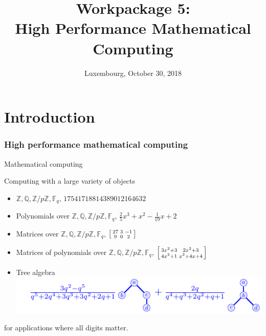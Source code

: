 \documentclass{beamer}
\title[Workpackage 5]{Workpackage 5:\\ High Performance Mathematical Computing}
\date{Luxembourg, October 30, 2018}
\institute[ODK 2nd project review]{Second OpenDreamKit Project review}
\newenvironment{smatrix}{\left[\begin{smallmatrix}}{\end{smallmatrix}\right]}
\newcommand{\Z}{\ensuremath{\mathbb{Z}\xspace}}
\newcommand{\Q}{\ensuremath{\mathbb{Q}\xspace}}
\newcommand{\F}{\ensuremath{\mathbb{F}\xspace}}
\begin{document}
\maketitle

\section*{Introduction}

\begin{frame}
  \frametitle{High performance mathematical computing}

  \begin{block}{Mathematical computing}

    Computing with a large variety of objects
        \begin{itemize}
        \item $\Z, \Q, \Z/p\Z, \F_q$, \hfill {\color{blue} $17541718814389012164632$}
        \item Polynomials over $\Z, \Q, \Z/p\Z, \F_q$, \hfill {\color{blue} $\frac{2}{5} x^{3} + x^{2} - \frac{1}{19} x + 2$}
        \item Matrices over $\Z, \Q, \Z/p\Z, \F_q$, \hfill
           {\color{blue} $\begin{smatrix} 27&3&-1\\ 9&0& 2 \end{smatrix} $}
        \item Matrices of polynomials over $\Z, \Q, \Z/p\Z, \F_q$, \hfill
          {\color{blue} $ \begin{smatrix}
            3 x^{2} + 3 & 2 x^{2} + 3 \\4 x^{2} + 1 & x^{2} + 4 x + 4
          \end{smatrix}$}
        \item Tree algebra \hfill
      \includegraphics[width=.7\textwidth]{Pictures/operade}
        \end{itemize}

        for applications where all digits matter.

  \end{block}
\end{frame}
\end{document}
